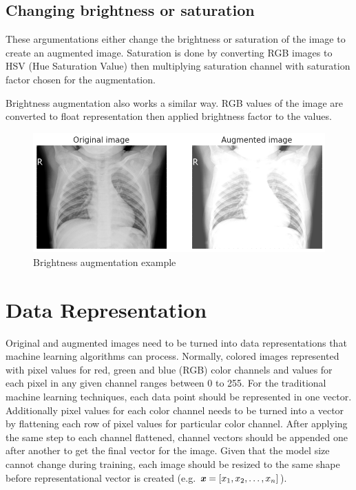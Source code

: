 \subsection{Changing brightness or saturation} \label{subsec:brightness}
These argumentations either change the brightness or saturation of the image to create an augmented image.
Saturation is done by converting RGB images to HSV (Hue Saturation Value) then multiplying saturation channel with saturation factor chosen for the augmentation.

Brightness augmentation also works a similar way.
RGB values of the image are converted to float representation then applied brightness factor to the values.

\begin{figure}[H]
    \centering
    \includegraphics[width=\textwidth]{img/augmented-image-1596666691.png}
    \caption{Brightness augmentation example}
    \label{fig:brightedxray}
\end{figure}


\section{Data Representation} \label{sec:datarepresentation}
Original and augmented images need to be turned into data representations that machine learning algorithms can process.
Normally, colored images represented with pixel values for red, green and blue (RGB) color channels and values for each pixel in any given channel ranges between 0 to 255.
For the traditional machine learning techniques, each data point should be represented in one vector.
Additionally pixel values for each color channel needs to be turned into a vector by flattening each row of pixel values for particular color channel.
After applying the same step to each channel flattened, channel vectors should be appended one after another to get the final vector for the image.
Given that the model size cannot change during training, each image should be resized to the same shape before representational vector is created (e.g. $\textbf{\textit{x}} = [x_1, x_2, \ldots, x_n]$).

